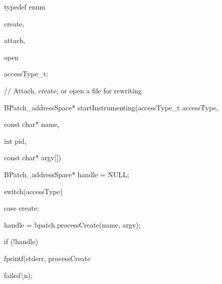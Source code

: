 {

typedef enum {}



{

create,}



{

attach,}



{

open}



{

} accessType_t;





\bigskip



{

// Attach, create, or open a file for rewriting}



{

BPatch_addressSpace* startInstrumenting(accessType_t accessType,}



{

const char* name,}



{

int pid,}



{

const char* argv[]) {}



{

BPatch_addressSpace* handle = NULL;}





\bigskip



{

switch(accessType) {}



{

case create:}



{

handle = bpatch.processCreate(name, argv);}



{

if (!handle) { fprintf(stderr, {\textquotedbl}processCreate

failed{\textbackslash}n{\textquotedbl}); }}



}}}
